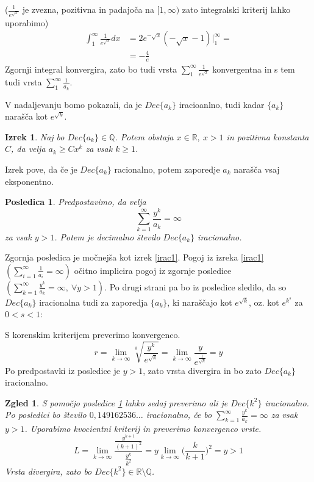 \documentclass[a4paper,12pt]{article}
\def\Q{\mathbb{Q}} %
\def\R{\mathbb{R}} %
\newtheorem{izrek}{Izrek}
\newtheorem{posledica}{Posledica}
\newtheorem{zgled}{Zgled}
\begin{document}
($\frac{1}{e^{\sqrt{x}}}$ je zvezna, pozitivna in padajoča na $[1, \infty)$ zato
integralski kriterij lahko uporabimo)
\[
    \begin{split}
    \int_1^{\infty}\frac{1}{e^{\sqrt{x}}}dx &= 2e^{-\sqrt{x}}(- \sqrt{x} - 1) \big|_1^{\infty} = \\
    &= -\frac{4}{e}
    \end{split}
\]
Zgornji integral konvergira, zato bo tudi vrsta $\sum_1^{\infty}\frac{1}{e^{\sqrt{x}}}$ konvergentna
in s tem tudi vrsta $\sum_1^{\infty}\frac{1}{a_k}$.

V nadaljevanju bomo pokazali, da je $Dec\{a_k\}$ iracioanlno, tudi kadar $\{a_k\}$ narašča kot $e^{\sqrt{k}}$.

\begin{izrek}
    \label{izrek1clanek2}
    Naj bo $Dec\{a_k\} \in \Q$. Potem obstaja $x \in \R, \ x > 1$ in pozitivna konstanta $C$,
    da velja $a_k \geq Cx^k$ za vsak $k \geq 1$.
\end{izrek}

Izrek pove, da če je $Dec\{a_k\}$ racionalno, potem zaporedje $a_k$ narašča vsaj eksponentno.

\begin{posledica}
    \label{posledica}
    Predpostavimo, da velja
    \[
        \sum_{k=1}^{\infty}\frac{y^k}{a_k} = \infty\]
    za vsak $y > 1$. Potem je decimalno število $Dec\{a_k\}$ iracionalno.
\end{posledica}

Zgornja posledica je močnejša kot izrek \ref{irac1}. Pogoj iz izreka \ref{irac1} 
$(\sum_{i=1}^{\infty} \frac{1}{a_i} = \infty)$ očitno implicira
pogoj iz zgornje posledice $(\sum_{k=1}^{\infty}\frac{y^k}{a_k} = \infty , \ \forall y > 1)$.
Po drugi strani pa bo iz posledice sledilo, da so $Dec\{a_k\}$ iracionalna tudi za zaporedja
$\{a_k\}$, ki naraščajo kot $e^{\sqrt{k}}$, oz. kot $e^{k^s}$ za $0 < s < 1$:

S korenskim kriterijem preverimo konvergenco.
\[
    r = \lim_{k \rightarrow \infty}\sqrt[k]{\frac{y^k}{e^{\sqrt{k}}}} = \lim_{k \rightarrow \infty}\frac{y}{e^{\frac{1}{\sqrt{k}}}}
    = y
\]
Po predpostavki iz posledice je $y > 1$, zato vrsta divergira in bo zato $Dec\{a_k\}$ iracionalno.
\\

\begin{zgled}
    S pomočjo posledice \ref{posledica} lahko sedaj preverimo ali je $Dec\{k^2\}$ iracionalno.
    Po posledici bo število $0,149162536\dots$ iracionalno, če bo $\sum_{k=1}^{\infty}\frac{y^k}{a_k} = \infty$
    za vsak $y > 1$. Uporabimo kvocientni kriterij in preverimo konvergenco vrste.
    \[
        L = \lim_{k \rightarrow \infty} \frac{\frac{y^{k+1}}{(k+1)^2}}{\frac{y^k}{k^2}}
        = y \lim_{k \rightarrow \infty} \big (\frac{k}{k + 1}\big)^2 = y > 1
    \]
    Vrsta divergira, zato bo $Dec\{k^2\} \in \R \setminus \Q$.
\end{zgled}
\end{document}
